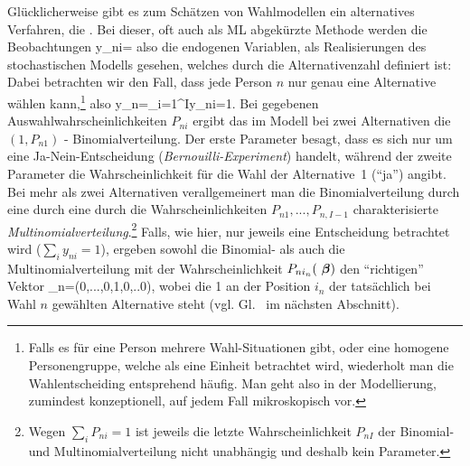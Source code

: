 Gl\"ucklicherweise gibt es zum Sch\"atzen von Wahlmodellen ein
alternatives Verfahren, die .
Bei dieser, oft auch als ML abgek\"urzte Methode
 werden die Beobachtungen
\be
\label{Yni}
y_{ni}=
\ee
also die endogenen Variablen,
als Realisierungen des stochastischen
Modells gesehen, welches durch die Alternativenzahl 
definiert ist: Dabei  betrachten wir den Fall, dass
jede Person $n$ nur genau eine Alternative w\"ahlen
kann,\footnote{Falls es f\"ur eine Person mehrere Wahl-Situationen
  gibt, oder eine homogene 
  Personengruppe, welche als eine Einheit
  betrachtet wird, wiederholt man die Wahlentscheiding entsprehend
  h\"aufig. Man geht also in der Modellierung, zumindest konzeptionell, auf 
jedem Fall mikroskopisch vor.}
 also
\be
\label{sumruley}
y_n=\sum_{i=1}^Iy_{ni}=1.
\ee
Bei gegebenen Auswahlwahrscheinlichkeiten $P_{ni}$ ergibt das im Modell
bei  zwei Alternativen die $(1,P_{n1})$ - Binomialverteilung. Der erste
Parameter besagt, dass es sich nur um eine Ja-Nein-Entscheidung
(\emph{Bernouilli-Experiment}) handelt, w\"ahrend der zweite Parameter
die Wahrscheinlichkeit f\"ur die Wahl der Alternative~1 (``ja'')
angibt. Bei mehr als zwei
Alternativen verallgemeinert man die Binomialverteilung 
 durch eine durch eine durch die Wahrscheinlichkeiten
 $P_{n1}, ..., P_{n,I-1}$ charakterisierte 
\emph{Multinomial\-verteilung}.\footnote{Wegen $\sum_iP_{ni}=1$ ist
  jeweils die letzte Wahrscheinlichkeit $P_{nI}$ der Binomial- und
  Multinomialverteilung nicht unabh\"angig und deshalb kein
  Parameter.} 
Falls, wie hier, nur jeweils eine Entscheidung
betrachtet wird ($\sum_i y_{ni}=1$), ergeben sowohl die Binomial- als
auch die  Multinomial\-verteilung mit der Wahrscheinlichkeit
$P_{ni_n}({\mbox{ \boldmath {$\beta$}}})$ den 
``richtigen'' Vektor
\bdm
{}_n=(0,...,0,1,0,..0)\tr,
\edm
wobei die 1 an der Position $i_n$ der tats\"achlich bei Wahl $n$ gew\"ahlten
Alternative steht (vgl. Gl.~ im n\"achsten Abschnitt).


